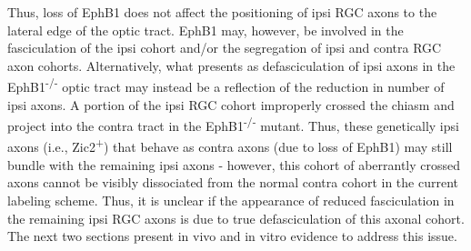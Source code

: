 Thus, loss of EphB1 does not affect the positioning of ipsi RGC axons to the lateral edge of the optic tract.
EphB1 may, however, be involved in the fasciculation of the ipsi cohort and/or the segregation of ipsi and contra RGC axon cohorts.
Alternatively, what presents as defasciculation of ipsi axons in the EphB1\textsuperscript{-/-} optic tract may instead be a reflection of the reduction in number of ipsi axons.
A portion of the ipsi RGC cohort improperly crossed the chiasm and project into the contra tract in the EphB1\textsuperscript{-/-} mutant.
Thus, these genetically ipsi axons (i.e., Zic2\textsuperscript{+}) that behave as contra axons (due to loss of EphB1) may still bundle with the remaining ipsi axons - however, this cohort of aberrantly crossed axons cannot be visibly dissociated from the normal contra cohort in the current labeling scheme.
Thus, it is unclear if the appearance of reduced fasciculation in the remaining ipsi RGC axons is due to true defasciculation of this axonal cohort.
The next two sections present in vivo and in vitro evidence to address this issue.